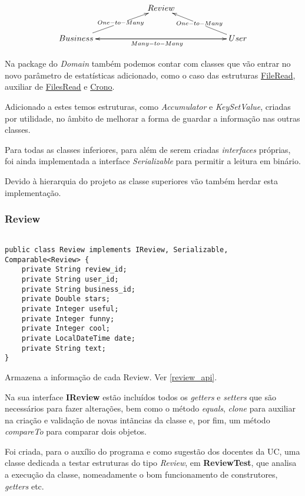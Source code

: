 \documentclass[11pt]{article}
\begin{document}
\begin{equation*}
	\xymatrixcolsep{5pc}\xymatrix {
	& Review \\ Business\ar[ur] |-{One-to-Many}\ar[rr] && User\ar[ul] |-{One-to-Many}\ar[ll]^{Many-to-Many}
	}
\end{equation*}

\vspace{1pc}
Na package do \textit{Domain} também podemos contar com classes que vão entrar no novo parâmetro de estatísticas adicionado, como o caso das estruturas \underline{FileRead}, auxiliar de \underline{FilesRead} e \underline{Crono}.

Adicionado a estes temos estruturas, como \textit{Accumulator} e \textit{KeySetValue}, criadas por utilidade, no âmbito de melhorar a forma de guardar a informação nas outras classes.

Para todas as classes inferiores, para além de serem criadas \textit{interfaces} próprias, foi ainda implementada a interface \textit{Serializable} para permitir a leitura em binário. 

Devido à hierarquia do projeto as classe superiores vão também herdar esta implementação.

\subsubsection{Review} \label{review}

\begin{verbatim}

public class Review implements IReview, Serializable, Comparable<Review> {
	private String review_id;
	private String user_id;
	private String business_id;
	private Double stars;
	private Integer useful;
	private Integer funny;
	private Integer cool;
	private LocalDateTime date;
	private String text;
}
\end{verbatim}

Armazena a informação de cada Review. Ver \ref{review_api}.

Na sua interface \textbf{IReview} estão incluídos todos os \textit{getters} e \textit{setters} que são necessários para fazer alterações, bem como o método \textit{equals}, \textit{clone} para auxiliar na criação e validação de novas intãncias da classe e, por fim, um método \textit{compareTo} para comparar dois objetos.

Foi criada, para o auxílio do programa e como sugestão dos docentes da UC, uma classe dedicada a testar estruturas do tipo \textit{Review}, em \textbf{ReviewTest}, que analisa a execução da classe, nomeadamente o bom funcionamento de construtores, \textit{getters} etc.
\end{document}
